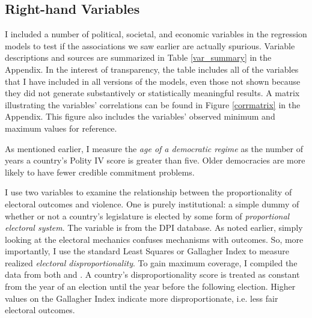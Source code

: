 \documentclass[a4paper]{article}\usepackage[]{graphicx}\usepackage[]{color}
\begin{document}
\subsection{Right-hand Variables}

I included a number of political, societal, and economic variables in the regression models to test if the associations we saw earlier are actually spurious. Variable descriptions and sources are summarized in Table \ref{var_summary} in the Appendix. In the interest of transparency, the table includes all of the variables that I have included in all versions of the models, even those not shown because they did not generate substantively or statistically meaningful results. A matrix illustrating the variables' correlations can be found in Figure \ref{corrmatrix} in the Appendix. This figure also includes the variables' observed minimum and maximum values for reference. 

As mentioned earlier, I measure the {\emph{age of a democratic regime}} as the number of years a country's Polity IV score is greater than five. Older democracies are more likely to have fewer credible commitment problems. 

I use two variables to examine the relationship between the proportionality of electoral outcomes and violence. One is purely institutional: a simple dummy of whether or not a country's legislature is elected by some form of {\emph{proportional electoral system}}. The variable is from the DPI database. As noted earlier, simply looking at the electoral mechanics confuses mechanisms with outcomes. So, more importantly, I use the standard Least Squares or Gallagher Index \citep{Gallagher1991} to measure realized {\emph{electoral disproportionality}}. To gain maximum coverage, I compiled the data from both \cite{Gallagher2012} and \cite{Carey2011}. A country's disproportionality score is treated as constant from the year of an election until the year before the following election. Higher values on the Gallagher Index indicate more disproportionate, i.e. less fair electoral outcomes. 
\end{document}
